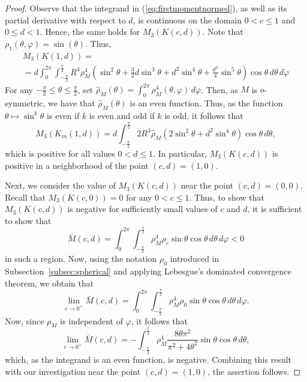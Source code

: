 \documentclass[twoside]{amsart}
\theoremstyle{plain}
\theoremstyle{definition}
\numberwithin{equation}{section}
\begin{document}
\begin{proof}
Observe that the integrand in (\ref{eq:firstmomentnormed}), as well as its partial derivative with respect to $d$, is continuous on the domain $0 < c \leq 1$ and $0 \leq d < 1$. Hence, the same holds for $M_3(K(c,d))$.
Note that $\rho_1(\theta, \varphi) = \sin(\theta)$. Thus,
\begin{multline*}
M_3(K(1,d)) =\\
= d \int_{0}^{2\pi}\int_{-\frac{\pi}{2}}^{\frac{\pi}{2}}  R^4 \rho_M^4 \left( \sin^2 \theta + \frac{3}{2} d \sin^3 \theta + d^2 \sin^4 \theta + \frac{d^3}{4} \sin^5 \theta\right) \cos \theta \,d\theta\,d\varphi
\end{multline*}
For any $-\frac{\pi}{2} \leq \theta \leq \frac{\pi}{2}$, set $\hat{\rho}_M(\theta) = \int_{0}^{2\pi} \rho_M^4(\theta,\varphi) \, d \varphi$. Then, as $M$ is $o$-symmetric, we have that $\hat{\rho}_M(\theta)$ is an even function. Thus, as the function $\theta \mapsto \sin^k \theta$ is even if $k$ is even and odd if $k$ is odd, it follows that
\begin{equation}\label{eq:firstmomentc1_2normed}
M_3(K_m(1,d)) = d \int_{-\frac{\pi}{2}}^{\frac{\pi}{2}}  2 R^4 \hat{\rho}_M \left( 2 \sin^2 \theta  + d^2 \sin^4 \theta \right) \cos \theta \,d\theta,
\end{equation}
which is positive for all values $0<d \leq 1$. In particular, $M_3(K(c,d))$ is positive in a neighborhood of the point $(c,d)=(1,0)$.

Next, we consider the value of $M_3(K(c,d))$ near the point $(c,d)=(0,0)$. Recall that $M_3(K(c,0))=0$ for any $0 < c \leq 1$. Thus, to show that $M_3(K(c,d))$ is negative for sufficiently small values of $c$ and $d$, it is sufficient to show that
\[
\bar{M}(c,d)= \int_{0}^{2\pi}\int_{-\frac{\pi}{2}}^{\frac{\pi}{2}}  \rho_M^4 \rho_c \sin \theta \cos \theta \,d\theta\,d\varphi < 0
\]
in such a region. Now, using the notation $\rho_0$ introduced in Subsection~\ref{subsec:spherical} and applying Lebesgue's dominated convergence theorem, we obtain that
\[
\lim_{c \to 0^+} \bar{M}(c,d) = \int_{0}^{2\pi}\int_{-\frac{\pi}{2}}^{\frac{\pi}{2}}  \rho_M^4 \rho_0 \sin \theta \cos \theta \,d\theta\,d\varphi .
\]
Now, since $\rho_M$ is independent of $\varphi$, it follows that
\[
\lim_{c \to 0^+} \bar{M}(c,d) = - \int_{-\frac{\pi}{2}}^{\frac{\pi}{2}} \rho_M^4 \frac{8 \theta \pi^2}{\pi^2+4 \theta^2} \sin \theta \cos \theta \,d\theta,
\]
which, as the integrand is an even function, is negative.
Combining this result with our investigation near the point $(c,d)=(1,0)$, the assertion follows.
\end{proof}
\end{document}
